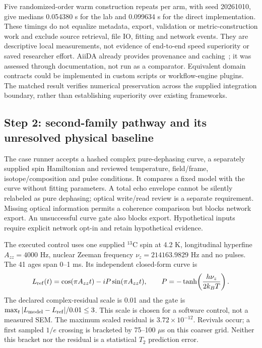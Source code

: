 \documentclass[11pt,a4paper]{article}
\begin{document}
Five randomized-order warm construction repeats per arm, with seed 20261010, give medians 0.054380 s for the lab and 0.099634 s for the direct implementation. These timings do not equalize metadata, export, validation or metric-construction work and exclude source retrieval, file IO, fitting and network events. They are descriptive local measurements, not evidence of end-to-end speed superiority or saved researcher effort. AiiDA already provides provenance and caching~\cite{aiida}; it was assessed through documentation, not run as a comparator. Equivalent domain contracts could be implemented in custom scripts or workflow-engine plugins. The matched result verifies numerical preservation across the supplied integration boundary, rather than establishing superiority over existing frameworks.

\subsection{Step 2: second-family pathway and its unresolved physical baseline}
The case runner accepts a hashed complex pure-dephasing curve, a separately supplied spin Hamiltonian and reviewed temperature, field/frame, isotope/composition and pulse conditions. It compares a fixed model with the curve without fitting parameters. A total echo envelope cannot be silently relabeled as pure dephasing; optical write/read review is a separate requirement. Missing optical information permits a coherence comparison but blocks network export. An unsuccessful curve gate also blocks export. Hypothetical inputs require explicit network opt-in and retain hypothetical evidence.

The executed control uses one supplied $^{13}$C spin at 4.2 K, longitudinal hyperfine $A_{zz}=4000$ Hz, nuclear Zeeman frequency $\nu_z=214163.9829$ Hz and no pulses. The 41 ages span 0--1 ms. Its independent closed-form curve is
\begin{equation}
L_{\rm ref}(t)=\cos(\pi A_{zz}t)-iP\sin(\pi A_{zz}t),\qquad
P=-\tanh\!\left(\frac{h\nu_z}{2k_BT}\right).
\end{equation}
The declared complex-residual scale is 0.01 and the gate is $\max_t|L_{\rm model}-L_{\rm ref}|/0.01\leq3$. This scale is chosen for a software control, not a measured SEM. The maximum scaled residual is $3.72\times10^{-12}$. Revivals occur; a first sampled $1/e$ crossing is bracketed by 75--100 $\mu$s on this coarser grid. Neither this bracket nor the residual is a statistical $T_2$ prediction error.
\end{document}
